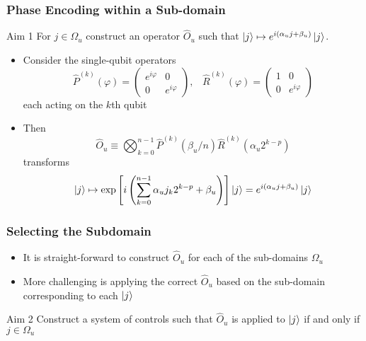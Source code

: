 \documentclass{beamer}
\begin{document}
\begin{frame}

\frametitle{Phase Encoding within a Sub-domain}

\begin{block}{Aim 1}
For $j \in \Omega_u$ construct an \alert{operator $\hat{O}_u$} such that $\ket{j} \mapsto e^{i (\alpha_u j + \beta_u )} \ket{j}$. 
\end{block}

\begin{itemize}
\item Consider the single-qubit operators 
\begin{equation}
\hat{P}^{(k)}(\varphi) = \begin{pmatrix}
e^{i \varphi} & 0 \\ 0 & e^{i \varphi}
\end{pmatrix}, \; \; \; \hat{R}^{(k)}(\varphi) = \begin{pmatrix}
1 & 0 \\ 0 & e^{i \varphi}
\end{pmatrix}
\end{equation}
each acting on the $k$th qubit
\item Then \alert{
\begin{equation}
\hat{O}_u \equiv \bigotimes^{n-1}_{k=0} \hat{P}^{(k)} (\beta_u / n) \hat{R}^{(k)} \left( \alpha_u 2^{k-p} \right)
\end{equation}}
transforms 
\begin{equation}
\ket{j} \mapsto \exp \left[ i \left( \sum_{k=0}^{n-1} \alpha_u j_k 2^{k-p} + \beta_u \right) \right] \ket{j} = e^{i (\alpha_u j + \beta_u )} \ket{j}
\end{equation}
\end{itemize}
\end{frame}

\begin{frame}
\frametitle{Selecting the Subdomain}
\begin{itemize}
\item It is straight-forward to construct $\hat{O}_u$ for each of the sub-domains $\Omega_u$ 
\item More challenging is \alert{applying the correct $\hat{O}_u$} based on the sub-domain corresponding to each $\ket{j}$
\end{itemize}
\begin{block}{Aim 2}
Construct a \alert{system of controls} such that $\hat{O}_u$ is applied to $\ket{j}$ if and only if $j \in \Omega_u$
\end{block}
\end{frame}
\end{document}
